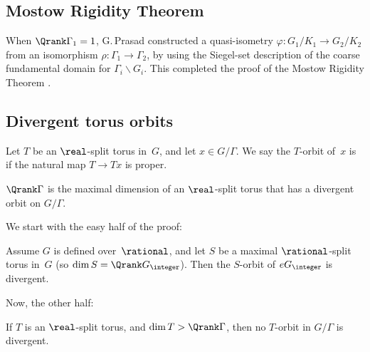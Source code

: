 \subsection{Mostow Rigidity Theorem}
When $\Qrank \Gamma_1 = 1$, G.\,Prasad constructed a quasi-isometry $\varphi \colon G_1/K_1 \to G_2/K_2$ from an isomorphism $\rho \colon \Gamma_1 \to \Gamma_2$, by using the Siegel-set description of the coarse fundamental domain for $\Gamma_i \backslash G_i$. %
This completed the proof of the Mostow Rigidity Theorem .


\subsection{Divergent torus orbits} \label{DivTorusSect}

\begin{defn}
Let $T$ be an $\real$-split torus in~$G$, and let $x \in G/\Gamma$. We say the $T$-orbit of~$x$ is  if the natural map $T \to Tx$ is proper.
\end{defn}

\begin{thm} \label{Qrank=DivTorus}
$\Qrank \Gamma$ is the maximal dimension of an $\real$-split torus that has a divergent orbit on $G/\Gamma$.
\end{thm}

We start with the easy half of the proof:

\begin{lem}
Assume $G$ is defined over~$\rational$, and let $S$ be a maximal $\rational$-split torus in~$G$ \textup(so $\dim S = \Qrank G_\integer$\textup). Then the $S$-orbit of $e G_\integer$ is divergent.
\end{lem}

Now, the other half:

\begin{thm}
If $T$ is an\/ $\real$-split torus, and\/ $\dim T > \Qrank \Gamma$, then no $T$-orbit in\/ $G/\Gamma$ is divergent.
\end{thm}

